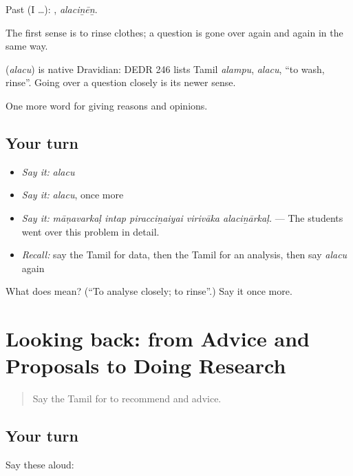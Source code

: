 Past (I …): , \emph{alaciṉēṉ}.

The first sense is to rinse clothes; a question is gone over again and again in the same way.

\begin{cousinweb}
\textbf{} (\emph{alacu}) is native Dravidian: DEDR 246 lists Tamil \emph{alampu}, \emph{alacu}, \textquotedblleft{}to wash, rinse\textquotedblright{}. Going over a question closely is its newer sense.
\end{cousinweb}

\begin{grammarlens}[title={What you've built}]
One more word for giving reasons and opinions.
\end{grammarlens}

\subsection*{Your turn}
\begin{itemize}
\raggedright
  \item \emph{Say it:} \emph{alacu}
  \item \emph{Say it:} \emph{alacu}, once more
  \item \emph{Say it:} \emph{māṇavarkaḷ intap piracciṉaiyai virivāka alaciṉārkaḷ.} — The students went over this problem in detail.
  \item \emph{Recall:} say the Tamil for data, then the Tamil for an analysis, then say \emph{alacu} again
\end{itemize}

\begin{tcolorbox}[breakable,colback=teal!4,colframe=teal!35!black,title={Before you move on}]
What does  mean? (\textquotedblleft{}To analyse closely; to rinse\textquotedblright{}.) Say it once more.
\end{tcolorbox}
\section[(dialogue)]{Looking back: from Advice and Proposals to Doing Research}

\label{lesson:TA-R362-review-355-362}



\begin{quote}
Say the Tamil for to recommend and advice.
\end{quote}

\subsection*{Your turn}
Say these aloud:

